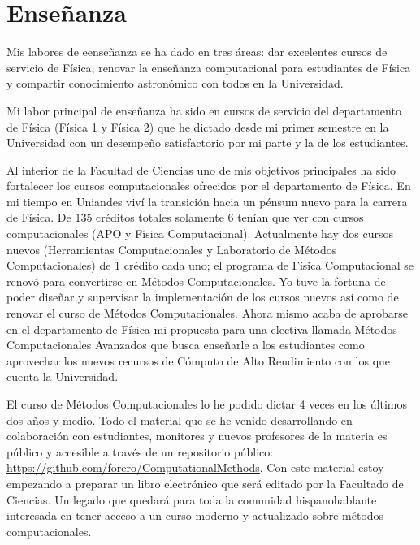 \documentclass[letterpaper,12pt,onecolumn]{article}
\begin{document}
\pagestyle{empty}
\section*{{\Large{\sc Ense\~nanza}}}

Mis labores de eense\~nanza se ha dado en tres \'areas: dar excelentes
cursos de servicio de F\'isica, renovar la ense\~nanza computacional
para estudiantes de F\'isica y compartir conocimiento astron\'omico
con todos en la Universidad.

Mi labor principal de ense\~nanza ha sido en cursos de servicio del
departamento de F\'isica (F\'isica 1 y F\'isica 2) que he dictado desde mi
primer semestre en la Universidad con un desempe\~no satisfactorio por
mi parte y la de los estudiantes.

Al interior de la Facultad de Ciencias uno de mis objetivos
principales ha sido fortalecer los cursos computacionales ofrecidos por
el departamento de F\'isica. En mi tiempo en Uniandes viv\'i la transici\'on
hacia un p\'ensum nuevo para la carrera de F\'isica. De 135 cr\'editos
totales solamente 6 ten\'ian que ver con cursos computacionales (APO y
F\'isica Computacional). Actualmente hay dos cursos nuevos (Herramientas
Computacionales y Laboratorio de M\'etodos Computacionales) de 1 cr\'edito
 cada uno; el programa de F\'isica Computacional se renov\'o para convertirse en
M\'etodos Computacionales. Yo tuve la fortuna de poder dise\~nar y
supervisar la implementaci\'on de los cursos nuevos as\'i como de renovar
el curso de M\'etodos  Computacionales. Ahora mismo acaba de aprobarse
en el departamento de F\'isica mi propuesta para una electiva llamada
M\'etodos Computacionales Avanzados que busca ense\~narle a los
estudiantes como aprovechar los nuevos  recursos de C\'omputo de Alto
Rendimiento con los que cuenta la Universidad.


El curso de M\'etodos Computacionales lo he podido dictar 4 veces en los
\'ultimos dos a\~nos y medio. Todo el material que se he venido
desarrollando en colaboraci\'on con estudiantes, monitores y nuevos
profesores de la materia es p\'ublico y accesible a trav\'es de un
repositorio p\'ublico: \url{https://github.com/forero/ComputationalMethods}.
Con este material estoy empezando a preparar un libro electr\'onico que
ser\'a editado por la Facultado de Ciencias. Un legado que quedar\'a para
toda la comunidad hispanohablante interesada en tener acceso a un
curso moderno y actualizado sobre m\'etodos computacionales.
\end{document}
